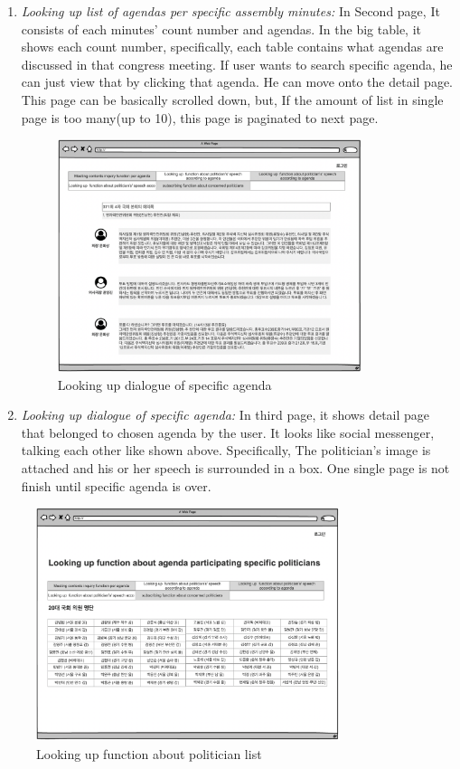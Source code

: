 \documentclass[conference]{IEEEtran}
\begin{document}
\begin{enumerate}
\begin{enumerate}
\begin{enumerate}
        \item \textit{Looking up list of agendas per specific assembly minutes: } In Second page, It consists of each minutes’ count number and agendas. In the big table, it shows each count number, specifically, each table contains what agendas are discussed in that congress meeting. If user wants to search specific agenda, he can just view that  by clicking that agenda. He can move onto the detail page. This page can be basically scrolled down, but, If the amount of list in single page is too many(up to 10), this page is paginated to next page.\\
        
                \begin{figure}[htbp]
    \centerline{\includegraphics[width=89mm,scale=0.5]{fig/5.png}}
    \caption{Looking up dialogue of specific agenda}
    \label{fig}
    \end{figure}     
 
         \item \textit{Looking up dialogue of specific agenda: } In third page, it shows detail page that belonged to chosen agenda by the user. It looks like social messenger, talking each other like shown above. Specifically, The politician’s image is attached and his or her speech is surrounded in a box. One single page is not finish until specific agenda is over.\\
           \end{enumerate}
           
                        \begin{figure}[htbp]
    \centerline{\includegraphics[width=89mm,scale=0.5]{fig/6.png}}
    \caption{Looking up function about politician list}
    \label{fig}
    \end{figure}     
           

\end{enumerate}
\end{enumerate}
\end{document}
